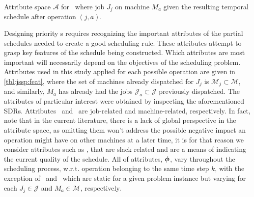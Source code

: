 \documentclass[smallextended]{svjour3}
\begin{document}
\begin{table}[t!] \centering
	\caption[Attribute space $\mathcal{A}$ for \JSP]{Attribute space 
	$\mathcal{A}$ for \JSP\ where job $J_j$ on machine $M_a$ given the 
	resulting temporal schedule after operation $(j,a)$.
	}
	\label{tbl:jssp:feat}
	
\end{table}

Designing priority \dr s requires recognizing the important 
attributes of the partial schedules needed to create a good scheduling rule. 
These attributes attempt to grasp key features of the schedule being 
constructed. Which attributes are most important will necessarily depend on the
objectives of the scheduling problem. 
Attributes used in this study applied for 
each possible operation are given in \cref{tbl:jssp:feat}, where the set of 
machines already dispatched for $J_j$ is $\mathcal{M}_j\subset\mathcal{M}$, 
and similarly, $M_a$ has already had the jobs $\mathcal{J}_a\subset\mathcal{J}$ 
previously dispatched.
The attributes of particular interest were obtained by inspecting the 
aforementioned SDRs. Attributes \phiJobRelated\ and \phiMacRelated\ are 
job-related and machine-related, respectively.
In fact, \cite{Pickardt2013} note that in the current literature, there is a 
lack of global perspective in the attribute space, as omitting them won't 
address the possible negative impact an operation might have on other machines 
at a later time, it is for that reason we consider attributes such as 
\phiSlackRelated, that are slack related and are a means of indicating the 
current quality of the schedule.
All of attributes, $\bm{\phi}$, vary throughout the scheduling process, 
w.r.t. operation belonging to the same time step $k$, with the exception of 
\phijobTotProcTime\ and \phimacTotProcTime\ which are static for a given 
problem instance but varying for each $J_j\in\mathcal{J}$ and 
$M_a\in\mathcal{M}$, respectively. 
\end{document}
